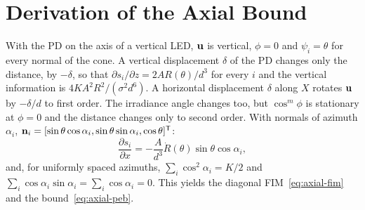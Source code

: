 \section{Derivation of the Axial Bound}
\label{app:axial}
With the PD on the axis of a vertical LED, $\mathbf{u}$ is vertical, $\phi=0$ and $\psi_i=\theta$ for every normal of the cone. A vertical displacement $\delta$ of the PD changes only the distance, by $-\delta$, so that $\partial s_i/\partial z=2AR(\theta)/d^3$ for every $i$ and the vertical information is $4KA^2R^2/(\sigma^2d^6)$. A horizontal displacement $\delta$ along $X$ rotates $\mathbf{u}$ by $-\delta/d$ to first order. The irradiance angle changes too, but $\cos^m\phi$ is stationary at $\phi=0$ and the distance changes only to second order. With normals of azimuth $\alpha_i$, $\mathbf{n}_i=[\sin\theta\cos\alpha_i,\sin\theta\sin\alpha_i,\cos\theta]^{\mathsf T}$:
\begin{equation}
 \frac{\partial s_i}{\partial x}=-\frac{A}{d^3}\dot R(\theta)\sin\theta\cos\alpha_i,
 \label{eq:axial-derivative}
\end{equation}
and, for uniformly spaced azimuths, $\sum_i\cos^2\alpha_i=K/2$ and $\sum_i\cos\alpha_i\sin\alpha_i=\sum_i\cos\alpha_i=0$. This yields the diagonal FIM~\eqref{eq:axial-fim} and the bound~\eqref{eq:axial-peb}.
